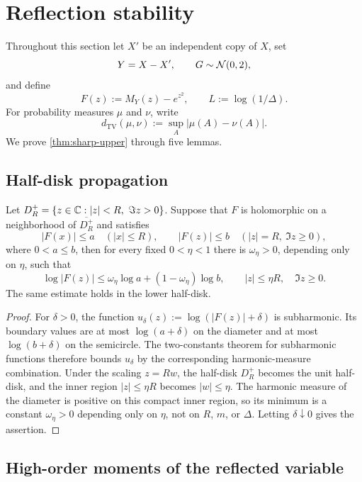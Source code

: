 \section{Reflection stability}\label{sec:upper}

Throughout this section let $X'$ be an independent copy of $X$, set
\[
Y=X-X',\qquad G\sim\mathcal N(0,2),
\]
and define
\[
F(z):=M_Y(z)-e^{z^2},\qquad
L:=\log(1/\Delta).
\]
For probability measures $\mu$ and $\nu$, write
\[
d_{\mathrm{TV}}(\mu,\nu):=\sup_A|\mu(A)-\nu(A)|.
\]
We prove \cref{thm:sharp-upper} through five lemmas.

\subsection{Half-disk propagation}

\begin{lemma}\label{lem:two-constants}
Let $D_R^+=\{z\in\mathbb C:|z|<R,\ \Im z>0\}$. Suppose that $F$ is holomorphic on a neighborhood of $\overline{D_R^+}$ and satisfies
\[
|F(x)|\le a\quad (|x|\le R),
\qquad
|F(z)|\le b\quad (|z|=R,\ \Im z\ge0),
\]
where $0<a\le b$, then for every fixed $0<\eta<1$ there is $\omega_\eta>0$, depending only on $\eta$, such that
\[
\log|F(z)|\le \omega_\eta\log a+(1-\omega_\eta)\log b,
\qquad |z|\le\eta R,\quad \Im z\ge0.
\]
The same estimate holds in the lower half-disk.
\end{lemma}

\begin{proof}
For $\delta>0$, the function $u_\delta(z):=\log(|F(z)|+\delta)$ is subharmonic. Its boundary values are at most $\log(a+\delta)$ on the diameter and at most $\log(b+\delta)$ on the semicircle. The two-constants theorem for subharmonic functions therefore bounds $u_\delta$ by the corresponding harmonic-measure combination. Under the scaling $z=Rw$, the half-disk $D_R^+$ becomes the unit half-disk, and the inner region $|z|\le\eta R$ becomes $|w|\le\eta$. The harmonic measure of the diameter is positive on this compact inner region, so its minimum is a constant $\omega_\eta>0$ depending only on $\eta$, not on $R$, $m$, or $\Delta$. Letting $\delta\downarrow0$ gives the assertion.
\end{proof}

\subsection{High-order moments of the reflected variable}

